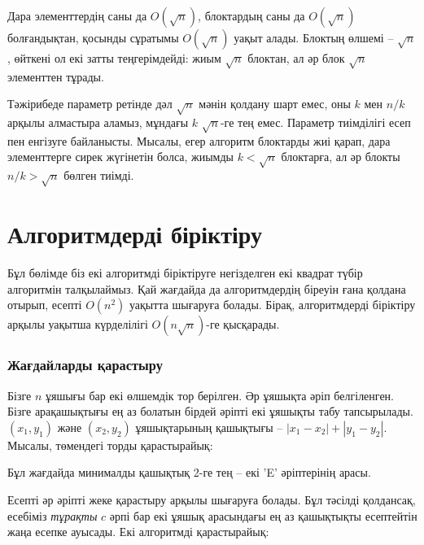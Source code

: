 Дара элементтердің саны да $O(\sqrt n)$,
блоктардың саны да $O(\sqrt n)$ болғандықтан, 
қосынды сұратымы $O(\sqrt n)$ уақыт алады. 
Блоктың өлшемі -- $\sqrt n$, өйткені ол екі затты теңгерімдейді: жиым $\sqrt n$ блоктан, ал әр блок $\sqrt n$ элементтен тұрады. 

Тәжірибеде параметр ретінде дәл $\sqrt n$ мәнін 
қолдану шарт емес, оны $k$ мен $n/k$ арқылы
алмастыра аламыз, мұндағы $k$ $\sqrt n$-ге тең емес. 
Параметр тиімділігі есеп пен енгізуге байланысты.
Мысалы, егер алгоритм блоктарды жиі қарап, 
дара элементтерге сирек жүгінетін болса,
жиымды $k < \sqrt n$ блоктарға, ал әр блокты
$n/k > \sqrt n$ бөлген тиімді.

\section{Алгоритмдерді біріктіру}

Бұл бөлімде біз екі алгоритмді біріктіруге негізделген
екі квадрат түбір алгоритмін талқылаймыз.
Қай жағдайда да алгоритмдердің біреуін ғана қолдана отырып, есепті 
$O(n^2)$ уақытта шығаруға болады. Бірақ, алгоритмдерді біріктіру арқылы
уақытша күрделілігі $O(n \sqrt n)$-ге қысқарады. 

\subsubsection{Жағдайларды қарастыру} %

Бізге $n$ ұяшығы бар екі өлшемдік тор берілген. 
Әр ұяшықта әріп белгіленген. Бізге арақашықтығы ең аз болатын бірдей 
әріпті екі ұяшықты табу тапсырылады. $(x_1,y_1)$ және
$(x_2,y_2)$ ұяшықтарының қашықтығы -- $|x_1-x_2|+|y_1-y_2|$. 
Мысалы, төмендегі торды қарастырайық:

\begin{center}
\end{center}
Бұл жағдайда минималды қашықтық 2-ге тең --
екі 'E' әріптерінің арасы.

Есепті әр әріпті жеке қарастыру арқылы шығаруға болады.
Бұл тәсілді қолдансақ, есебіміз \emph{тұрақты} $c$ әрпі
бар екі ұяшық арасындағы ең аз қашықтықты есептейтін жаңа есепке ауысады.
Екі алгоритмді қарастырайық:

